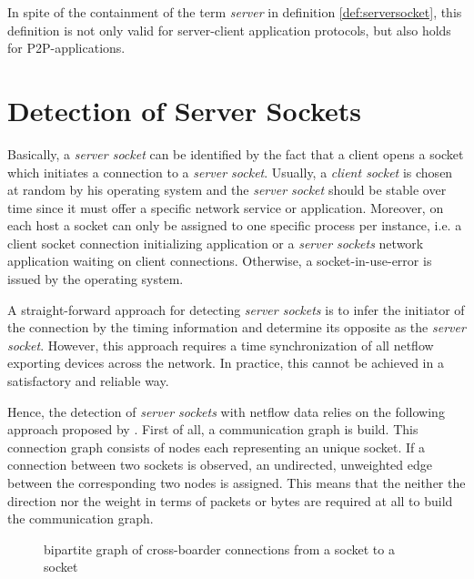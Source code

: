 In spite of the containment of the term \emph{server} in definition 
\ref{def:serversocket}, this definition is not only valid for server-client 
application protocols, but also holds for P2P-applications.

\section{Detection of Server Sockets\label{section:socket_detection}}

Basically, a \emph{server socket} can be identified by the fact that a client 
opens a socket which initiates a connection to a \emph{server socket}. Usually, 
a \emph{client socket} is chosen at random by his operating system and the 
\emph{server socket} should be stable over time since it must offer a specific 
network service or application. Moreover, on each host a socket can only be 
assigned to one specific process per instance, i.e. a client socket connection 
initializing application or a \emph{server sockets} network 
application waiting on client connections. Otherwise, a socket-in-use-error is issued by the operating system. 

A straight-forward approach for detecting \emph{server sockets} is to infer the
initiator of the connection by the timing information and determine its opposite
as the \emph{server socket}. However, this approach requires a time 
synchronization of all netflow exporting devices across the network. In 
practice, this cannot be achieved in a satisfactory and reliable way.

 Hence, the detection of \emph{server sockets} with
netflow data relies on the following approach proposed by
\citet{Schatzmann:Mining,Schatzmann:Dissection, Schatzmann:Tracing}. First of
all, a communication graph is build. This connection graph consists of nodes
each representing an unique socket. If a connection between two sockets is
observed, an undirected, unweighted edge between the corresponding two nodes is
assigned. This means that the neither the direction nor the weight in terms of
packets or bytes are required at all to build the communication graph.

\begin{figure}
	[ht] \centering {}
	
	\caption{bipartite graph of cross-boarder connections from a socket to a
	socket} 
	\label{fig:bipartite_graph} 
\end{figure}

